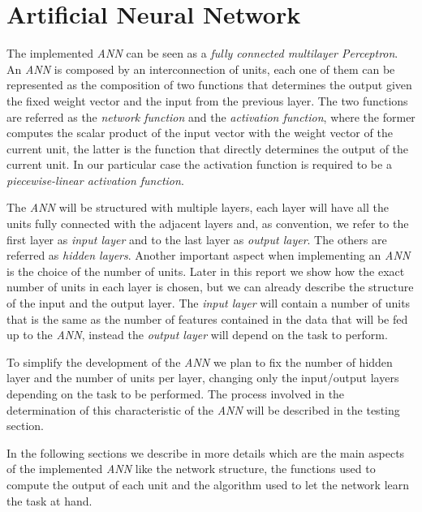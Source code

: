 \section{Artificial Neural Network}
\label{sec:ann}
The implemented \textit{ANN} can be seen as a \textit{fully connected multilayer Perceptron}. An \textit{ANN} is composed by an interconnection of units, each one of them can be represented as the composition of two functions that determines the output given the fixed weight vector and the input from the previous layer. The two functions are referred as the \textit{network function} and the \textit{activation function}, where the former computes the scalar product of the input vector with the weight vector of the current unit, the latter is the function that directly determines the output of the current unit. In our particular case the activation function is required to be a \textit{piecewise-linear activation function}.

The \textit{ANN} will be structured with multiple layers, each layer will have all the units fully connected with the adjacent layers and, as convention, we refer to the first layer as \textit{input layer} and to the last layer as \textit{output layer}. The others are referred as \textit{hidden layers}. Another important aspect when implementing an \textit{ANN} is the choice of the number of units. Later in this report we show how the exact number of units in each layer is chosen, but we can already describe the structure of the input and the output layer. The \textit{input layer} will contain a number of units that is the same as the number of features contained in the data that will be fed up to the \textit{ANN}, instead the \textit{output layer} will depend on the task to perform.

To simplify the development of the \textit{ANN} we plan to fix the number of hidden layer and the number of units per layer, changing only the input/output layers depending on the task to be performed. The process involved in the determination of this characteristic of the \textit{ANN} will be described in the testing section.

In the following sections we describe in more details which are the main aspects of the implemented \textit{ANN} like the network structure, the functions used to compute the output of each unit and the algorithm used to let the network learn the task at hand.

